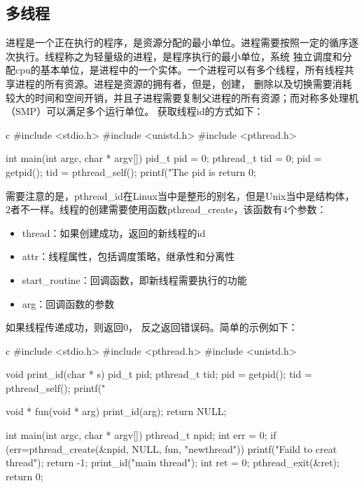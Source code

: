 \subsection{多线程}
进程是一个正在执行的程序，是资源分配的最小单位。进程需要按照一定的循序逐次执行。线程称之为轻量级的进程，是程序执行的最小单位，系统
独立调度和分配cpu的基本单位，是进程中的一个实体。一个进程可以有多个线程，所有线程共享进程的所有资源。进程是资源的拥有者，但是，创建，
删除以及切换需要消耗较大的时间和空间开销，并且子进程需要复制父进程的所有资源；而对称多处理机（SMP）可以满足多个运行单位。
获取线程id的方式如下：
\begin{code-block}{c}
#include <stdio.h>
#include <unistd.h>
#include <pthread.h>

int main(int argc, char * argv[])
{
        pid_t pid = 0;
        pthread_t tid = 0;
        pid = getpid();
        tid = pthread_self();
        printf("The pid is %
        return 0;
}
\end{code-block}

需要注意的是，pthread\_id在Linux当中是整形的别名，但是Unix当中是结构体，2者不一样。线程的创建需要使用函数pthread\_create，该函数有4个参数：
\begin{itemize}
  \item thread：如果创建成功，返回的新线程的id
  \item attr：线程属性，包括调度策略，继承性和分离性
  \item start\_routine：回调函数，即新线程需要执行的功能
  \item arg：回调函数的参数
\end{itemize}
如果线程传递成功，则返回0， 反之返回错误码。简单的示例如下：
\begin{code-block}{c}
#include <stdio.h>
#include <pthread.h>
#include <unistd.h>

void print_id(char * s)
{
        pid_t pid;
        pthread_t tid;
        pid = getpid();
        tid = pthread_self();
        printf("%
}

void * fun(void * arg)
{
        print_id(arg);
        return NULL;
}

int main(int argc, char * argv[])
{
        pthread_t npid;
        int err = 0;
        if (err=pthread_create(&npid, NULL, fun, "newthread"))
        {
                printf("Faild to creat thread\n");
                return -1;
        }
        print_id("main thread");
        int ret = 0;
        pthread_exit(&ret);
        return 0;
}
\end{code-block}

